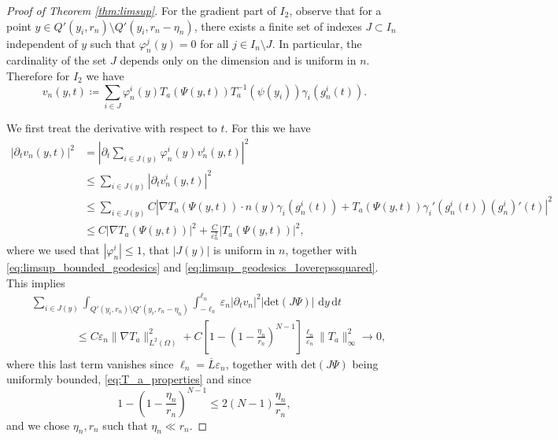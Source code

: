 \documentclass[a4paper, 11pt, reqno]{amsart}
\theoremstyle{plain}
\theoremstyle{definition}
\theoremstyle{remark}
\newcommand{\dd}{\,\mathrm{d}}
\begin{document}
\begin{proof}[Proof of Theorem \ref{thm:limsup}]
For the gradient part of $I_2$, observe that for a point $y \in Q'(y_i,r_n) \setminus Q'(y_i, r_n - \eta_n)$, there exists a finite set of indexes $J \subset I_n$ independent of $y$ such that $\varphi_n^j(y) = 0$ for all $j \in I_n \setminus J$. In particular, the cardinality of the set $J $ depends only on the dimension and is uniform in $n$. Therefore for $I_2$ we have
$$ v_n(y,t) \coloneqq \sum_{i \in J} \varphi_n^i(y) T_a (\Psi(y,t)) T_a^{-1} (\psi(y_i)) \gamma_i(g_n^i(t)). $$

We first treat the derivative with respect to $t$. For this we have
\begin{align*}
    | \partial_t v_n (y,t)|^2 &= \left| \partial_t \sum_{i \in J(y)} \varphi_n^i(y) v_n^i (y,t) \right|^2 \\
    &\leq \sum_{i \in J(y)} |\partial_t v_n^i(y,t)|^2 \\
    &\leq \sum_{i \in J(y)} C | \nabla T_a (\Psi(y,t)) \cdot n(y) \gamma_i (g_n^i(t)) + T_a (\Psi(y,t)) \gamma_i'(g_n^i(t)) (g_n^i)'(t) |^2 \\
    &\leq C | \nabla T_a (\Psi(y,t)) |^2 + \frac{C}{\varepsilon_n^2} |T_a (\Psi(y,t))|^2,
\end{align*}
where we used that $| \varphi_n^i | \leq 1$, that $| J(y) | $ is uniform in $n$, together with \eqref{eq:limsup_bounded_geodesics} and \eqref{eq:limsup_geodesics_1overepssquared}.
This implies 
\begin{align}
    &\sum_{i \in J(y)} \int_{Q'(y_i,r_n) \setminus Q'(y_i, r_n - \eta_n)} \int_{-\ell_n}^{\ell_n} \varepsilon_n | \partial_t v_n|^2 | \mathrm{det}(J \Psi) | \,\dd y \dd t \nonumber\\
    &\qquad\qquad\leq C \varepsilon_n \| \nabla T_a \|^2_{L^2(\Omega)} + C\left[ 1 - \left( 1 - \frac{\eta_n}{r_n} \right)^{N-1} \right] \frac{\ell_n}{\varepsilon_n} \| T_a\|^2_\infty \to 0,
\end{align}
where this last term vanishes since $\ell_n = \overline{L} \varepsilon_n$, together with $\mathrm{det}(J \Psi)$ being uniformly bounded, \eqref{eq:T_a_properties} and since
$$  1 - \left( 1 - \frac{\eta_n}{r_n} \right)^{N-1} \leq 2 (N-1) \frac{\eta_n}{r_n}, $$
and we chose $\eta_n, r_n$ such that $\eta_n \ll r_n$.


\end{proof}
\end{document}
